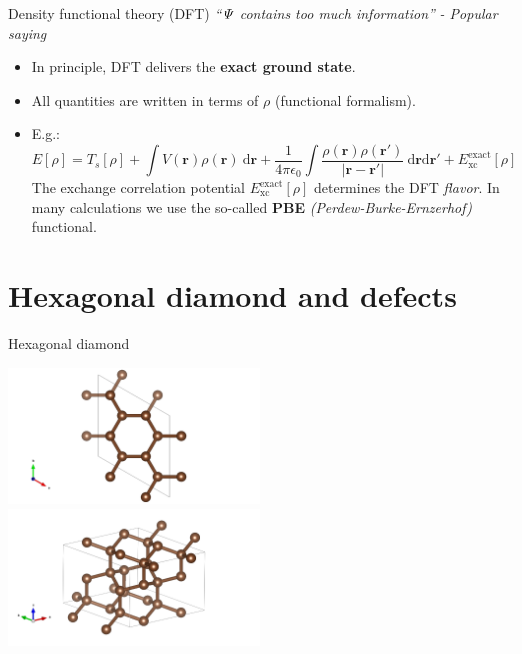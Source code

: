 \documentclass[notes=hide]{beamer}
\begin{document}
\begin{frame}{Density functional theory (DFT)}
  \textit{``$ \it \Psi  $  contains too much information''}
  \hfill \textit{- Popular saying}
  \begin{itemize}
    \item In principle, DFT delivers the \textbf{exact ground state}.

    \item All quantities are written in terms of $ \rho $ (functional formalism).
    \item E.g.:
      \[
        E[ \rho ] =
        T_{s} [ \rho  ]
        +
        \int  V ( \mathbf{r} ) \rho ( \mathbf{r} ) \ \mathrm{d} \mathbf{r}
        +
        \frac{1}{4\pi \epsilon _{0}}
        \int
        \frac{\rho ( \mathbf{r} ) \rho ( \mathbf{r}' )}{| \mathbf{r} - \mathbf{r}'|}
        \ \mathrm{d} \mathbf{r}\mathrm{d} \mathbf{r}'
        +
        E^{ \mathrm{exact}}_{ \mathrm{xc}} [ \rho ]
      \]
      The exchange correlation potential
      $ E^{ \mathrm{exact}}_{ \mathrm{xc}} [ \rho ] $
      determines the DFT \textit{flavor}.
      In many calculations we use the so-called \textbf{PBE} \textit{(Perdew-Burke-Ernzerhof)} functional.
  \end{itemize}
\end{frame}




\section{Hexagonal diamond and defects} %


\begin{frame}{Hexagonal diamond}
  \begin{center}
    \includegraphics[width=0.5\textwidth, trim=0 0 30em 0,clip]{images/poscar_hex_16_hex-view.png}\\
    \includegraphics[width=0.5\textwidth, trim=0 0 27em 0,clip]{images/poscar_hex_16_birdseye.png}
  \end{center}
\end{frame}
\end{document}
